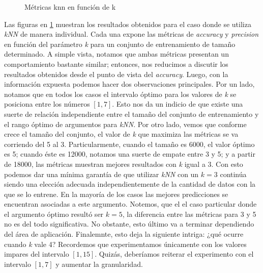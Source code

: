 \begin{figure}[h]
    
    \caption{Métricas knn en función de k}
    \label{fig:metricas_knn}
\end{figure}
\par
Las figuras en \ref{fig:metricas_knn} muestran los resultados obtenidos para el caso donde se utiliza \emph{kNN} de manera individual. Cada una expone las métricas de \emph{accuracy} y \emph{precision} en función del parámetro \emph{k} para un conjunto de entrenamiento de tamaño determinado. A simple vista, notamos que ambas métricas presentan un comportamiento bastante similar; entonces, nos reducimos a discutir los resultados obtenidos desde el punto de vista del \emph{accuracy}. Luego, con la información expuesta podemos hacer dos observaciones principales. Por un lado, notamos que en todos los casos el intervalo óptimo para los valores de \emph{k} se posiciona entre los números $[1, 7]$. Esto nos da un indicio de que existe una suerte de relación independiente entre el tamaño del conjunto de entrenamiento y el rango óptimo de argumentos para \emph{kNN}. Por otro lado, vemos que conforme crece el tamaño del conjunto, el valor de \emph{k} que maximiza las métricas se va corriendo del 5 al 3. Particularmente, cuando el tamaño es 6000, el valor óptimo es 5; cuando éste es 12000, notamos una suerte de empate entre 3 y 5; y a partir de 18000, las métricas muestran mejores resultados con \emph{k} igual a 3. Con esto podemos dar una mínima garantía de que utilizar \emph{kNN} con un $k=3$ continúa siendo una elección adecuada independientemente de la cantidad de datos con la que se lo entrene. En la mayoría de los casos las mejores predicciones se encuentran asociadas a este argumento. Notemos, que el el caso particular donde el argumento óptimo resultó ser $k=5$, la diferencia entre las métricas para 3 y 5 no es del todo significativa. No obstante, esto último va a terminar dependiendo del área de aplicación. Finalemnte, esto deja la siguiente intriga: ¿qué ocurre cuando \emph{k} vale 4? Recordemos que experimentamos únicamente con los valores impares del intervalo $[1,15]$. Quizás, deberíamos reiterar el experimento con el intervalo $[1,7]$ y aumentar la granularidad.
